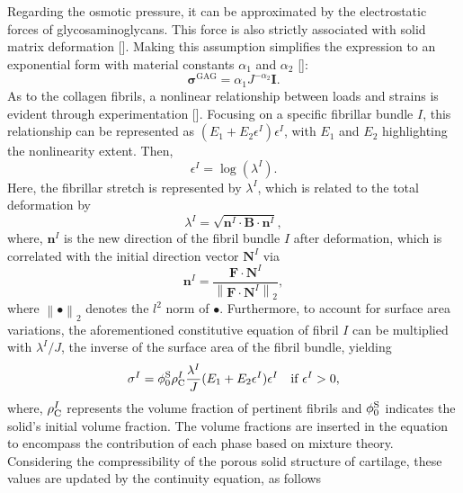 Regarding the osmotic pressure, it can be approximated by the electrostatic forces of glycosaminoglycans. This force is also strictly associated with solid matrix deformation [\cite{ateshian2004}]. Making this assumption simplifies the expression to an exponential form with material constants \(\alpha_1\) and \(\alpha_2\) [\cite{ateshian2004,buschmann1995,stender2013}]:
%
\begin{equation}\label{eq-osmotic}
    \boldsymbol{\sigma}^{\text{GAG}} = \alpha_1 J^{-\alpha_2} \mathbf{I}.
\end{equation}
%
As to the collagen fibrils, a nonlinear relationship between loads and strains is evident through experimentation [\cite{charlebois2004}]. Focusing on a specific fibrillar bundle $I$, this relationship can be represented as $(E_1 + E_2 \epsilon^I) \epsilon^I$, with $E_1$ and $E_2$ highlighting the nonlinearity extent. Then,
%
\begin{equation}
    \epsilon^I = \log (\lambda^I).
\end{equation}
%
Here, the fibrillar stretch is represented by $\lambda^I$, which is related to the total deformation by
%
\begin{equation}\label{eq:phi}
    \lambda^I = \sqrt{\mathbf{n}^I \cdot \mathbf{B} \cdot\mathbf{n}^I},
\end{equation}
where, $\mathbf{n}^I$ is the new direction of the fibril bundle $I$ after deformation, which is correlated with the initial direction vector $\mathbf{N}^I$ via 
%
\begin{equation}\label{eq:n}
\mathbf{n}^I = \frac{\mathbf{F} \cdot \mathbf{N}^I}{\left \| \mathbf{F} \cdot\mathbf{N}^I \right \|_{2}},
\end{equation}
%
where $\left \| \bullet \right \|_{2}$ denotes the $l^2$ norm of $\bullet$.  Furthermore, to account for surface area variations, the aforementioned constitutive equation of fibril $I$ can be multiplied with $\lambda^I/J$, the inverse of the surface area of the fibril bundle, yielding
%
\begin{equation}
    \sigma^I = \phi^{\rm S}_0 \rho_{\rm C}^I \frac{\lambda^I}{J}(E_1 + E_2 \epsilon^I) \epsilon^I \quad \text{if } \epsilon^I > 0,
\end{equation}
%
where, $\rho_{\rm C}^I$ represents the volume fraction of pertinent fibrils and $\phi^{\rm S}_0$ indicates the solid's initial volume fraction. The volume fractions are inserted in the equation to encompass the contribution of each phase based on mixture theory. Considering the compressibility of the porous solid structure of cartilage, these values are updated by the continuity equation, as follows
